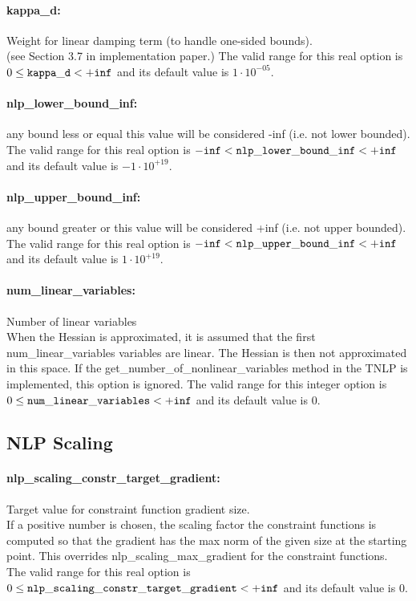 \paragraph{kappa\_d:}\label{sec:kappa_d} Weight for linear damping term (to handle one-sided bounds). $\;$ \\
 (see Section 3.7 in implementation paper.) The valid range for this real option is 
$0 \le {\tt kappa\_d } <  {\tt +inf}$
and its default value is $1 \cdot 10^{-05}$.


\paragraph{nlp\_lower\_bound\_inf:}\label{sec:nlp_lower_bound_inf} any bound less or equal this value will be considered -inf (i.e. not lower bounded). $\;$ \\
 The valid range for this real option is 
${\tt -inf} <  {\tt nlp\_lower\_bound\_inf } <  {\tt +inf}$
and its default value is $-1 \cdot 10^{+19}$.


\paragraph{nlp\_upper\_bound\_inf:}\label{sec:nlp_upper_bound_inf} any bound greater or this value will be considered +inf (i.e. not upper bounded). $\;$ \\
 The valid range for this real option is 
${\tt -inf} <  {\tt nlp\_upper\_bound\_inf } <  {\tt +inf}$
and its default value is $1 \cdot 10^{+19}$.


\paragraph{num\_linear\_variables:}\label{sec:num_linear_variables} Number of linear variables $\;$ \\
 When the Hessian is approximated, it is assumed
that the first num\_linear\_variables variables
are linear.  The Hessian is then not approximated
in this space.  If the
get\_number\_of\_nonlinear\_variables method in
the TNLP is implemented, this option is ignored. The valid range for this integer option is
$0 \le {\tt num\_linear\_variables } <  {\tt +inf}$
and its default value is $0$.


\subsection{NLP Scaling}
\label{sec:NLP_Scaling}
\paragraph{nlp\_scaling\_constr\_target\_gradient:}\label{sec:nlp_scaling_constr_target_gradient} Target value for constraint function gradient size. $\;$ \\
 If a positive number is chosen, the scaling
factor the constraint functions is computed so
that the gradient has the max norm of the given
size at the starting point.  This overrides
nlp\_scaling\_max\_gradient for the constraint
functions. The valid range for this real option is 
$0 \le {\tt nlp\_scaling\_constr\_target\_gradient } <  {\tt +inf}$
and its default value is $0$.


